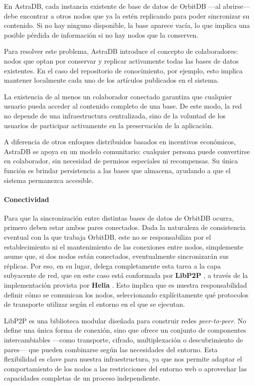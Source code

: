 En AstraDB, cada instancia existente de base de datos de OrbitDB —al abrirse— debe encontrar a otros nodos que ya la estén replicando para poder sincronizar su contenido. Si no hay ninguno disponible, la base aparece vacía, lo que implica una posible pérdida de información si no hay nodos que la conserven.

Para resolver este problema, AstraDB introduce el concepto de colaboradores: nodos que optan por conservar y replicar activamente todas las bases de datos existentes. En el caso del repositorio de conocimiento, por ejemplo, esto implica mantener localmente cada uno de los artículos publicados en el sistema.

La existencia de al menos un colaborador conectado garantiza que cualquier usuario pueda acceder al contenido completo de una base. De este modo, la red no depende de una infraestructura centralizada, sino de la voluntad de los usuarios de participar activamente en la preservación de la aplicación.

A diferencia de otros enfoques distribuidos basados en incentivos económicos, AstraDB se apoya en un modelo comunitario: cualquier persona puede convertirse en colaborador, sin necesidad de permisos especiales ni recompensas. Su única función es brindar persistencia a las bases que almacena, ayudando a que el sistema permanezca accesible.

\paragraph{Conectividad}

Para que la sincronización entre distintas bases de datos de OrbitDB ocurra, primero deben estar ambos pares conectados. Dada la naturaleza de consistencia eventual con la que trabaja OrbitDB, este no se responsabiliza por el establecimiento ni el mantenimiento de las conexiones entre nodos, simplemente asume que, si dos nodos están conectados, eventualmente sincronizarán sus réplicas.  Por eso, en su lugar, delega completamente esta tarea a la capa subyacente de red, que en este caso está conformada por \textbf{LibP2P} \cite{libp2p}, a través de la implementación provista por \textbf{Helia} \cite{helia}. Esto implica que es nuestra responsabilidad definir cómo se comunican los nodos, seleccionando explícitamente qué protocolos de transporte utilizar según el entorno en el que se ejecutan.

LibP2P es una biblioteca modular diseñada para construir redes \textit{peer-to-peer}. No define una única forma de conexión, sino que ofrece un conjunto de componentes intercambiables —como transporte, cifrado, multiplexación o descubrimiento de pares— que pueden combinarse según las necesidades del entorno. Esta flexibilidad es clave para nuestra infraestructura, ya que nos permite adaptar el comportamiento de los nodos a las restricciones del entorno web o aprovechar las capacidades completas de un proceso independiente.

